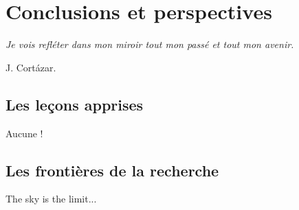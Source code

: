 \chapter{Conclusions et perspectives} \label{CONCL} \smallskip \hfill
\begin{minipage}[b]{8cm}
{\it Je vois refl\'eter dans mon miroir tout mon pass\'e et tout mon avenir.}
\end{minipage}
\begin{flushright} J. Cort\'azar. \end{flushright}
\bigskip

\section{Les le\c cons apprises}

Aucune !
\bigskip

\section{Les fronti\`eres de la recherche}

The sky is the limit...